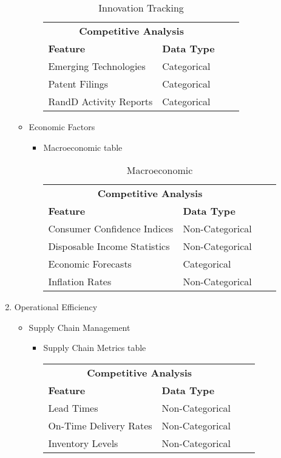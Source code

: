 \documentclass[12pt,a4Paper]{article}
\begin{document}
\begin{enumerate}
\begin{itemize}
\begin{itemize}
\begin{table}
\begin{tabular}{llll}
		\multicolumn{2}{c}{\textbf{Competitive Analysis}} & &\\
		\textbf{Feature} & \textbf{Data Type}\\\hline
		Emerging Technologies & Categorical\\
		Patent Filings & Categorical\\
		RandD Activity Reports & Categorical\\\hline
		\end{tabular}
		\centering
		\caption{Innovation Tracking}
		\end{table}
		\end{itemize}
	\item Economic Factors
		\begin{itemize}
		\item Macroeconomic table
		\begin{table}
		\begin{tabular}{llll}\hline
		\multicolumn{2}{c}{\textbf{Competitive Analysis}} & &\\
		\textbf{Feature} & \textbf{Data Type}\\\hline
		Consumer Confidence Indices & Non-Categorical\\
		Disposable Income Statistics & Non-Categorical\\
		Economic Forecasts & Categorical\\
		Inflation Rates & Non-Categorical\\\hline
		\end{tabular}
		\centering
		\caption{Macroeconomic}
		\end{table}
		\end{itemize}
	\end{itemize}
\item Operational Efficiency
	\begin{itemize}
	\item Supply Chain Management
		\begin{itemize}
		\item Supply Chain Metrics table
		\begin{table}
		\begin{tabular}{llll}\hline
		\multicolumn{2}{c}{\textbf{Competitive Analysis}} & &\\
		\textbf{Feature} & \textbf{Data Type}\\\hline
		Lead Times & Non-Categorical\\
		On-Time Delivery Rates & Non-Categorical\\
		Inventory Levels & Non-Categorical\\

\end{tabular}
\end{table}
\end{itemize}
\end{itemize}
\end{enumerate}
\end{document}
